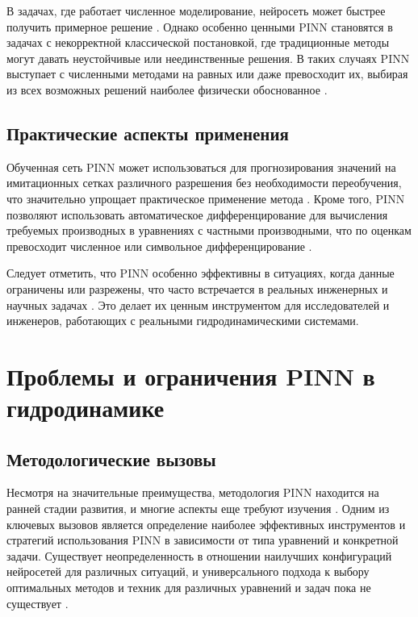 В задачах, где работает численное моделирование, нейросеть может быстрее получить примерное
решение \cite{kochkov2021machine}. Однако особенно ценными PINN становятся в задачах с некорректной классической постановкой,
где традиционные методы могут давать неустойчивые или неединственные решения. В таких случаях PINN выступает с численными
методами на равных или даже превосходит их, выбирая из всех возможных решений наиболее физически обоснованное
\cite{yang2019adversarial}.

\subsection{Практические аспекты применения}
Обученная сеть PINN может использоваться для прогнозирования значений на имитационных сетках различного разрешения без
необходимости переобучения, что значительно упрощает практическое применение метода \cite{raissi2019physics}. Кроме того,
PINN позволяют использовать автоматическое дифференцирование для вычисления требуемых производных в уравнениях с частными
производными, что по оценкам превосходит численное или символьное дифференцирование \cite{baydin2018automatic}.

Следует отметить, что PINN особенно эффективны в ситуациях, когда данные ограничены или разрежены, что часто встречается
в реальных инженерных и научных задачах \cite{zhu2019physics}. Это делает их ценным инструментом для исследователей и
инженеров, работающих с реальными гидродинамическими системами.

\section{Проблемы и ограничения PINN в гидродинамике}
\subsection{Методологические вызовы}
Несмотря на значительные преимущества, методология PINN находится на ранней стадии развития, и многие аспекты еще требуют
изучения \cite{cuomo2022scientific}. Одним из ключевых вызовов является определение наиболее эффективных инструментов
и стратегий использования PINN в зависимости от типа уравнений и конкретной задачи. Существует неопределенность в отношении
наилучших конфигураций нейросетей для различных ситуаций, и универсального подхода к выбору оптимальных методов и техник
для различных уравнений и задач пока не существует \cite{krishnapriyan2021characterizing}.

